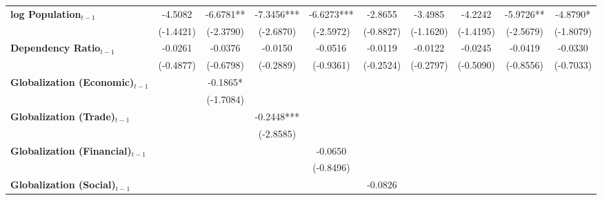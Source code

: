 \begin{center}
\begin{tabular}{lccccccccc}
\textbf{log Population$_{t-1}$}      &    -4.5082     &    -6.6781**     &    -7.3456***    &    -6.6273***    &     -2.8655      &     -3.4985      &     -4.2242      &    -5.9726**     &     -4.8790*      \\
\textbf{ }                         &   (-1.4421)    &    (-2.3790)     &    (-2.6870)     &    (-2.5972)     &    (-0.8827)     &    (-1.1620)     &    (-1.4195)     &    (-2.5679)     &    (-1.8079)      \\
\textbf{Dependency Ratio$_{t-1}$}   &    -0.0261     &     -0.0376      &     -0.0150      &     -0.0516      &     -0.0119      &     -0.0122      &     -0.0245      &     -0.0419      &     -0.0330       \\
\textbf{ }                         &   (-0.4877)    &    (-0.6798)     &    (-0.2889)     &    (-0.9361)     &    (-0.2524)     &    (-0.2797)     &    (-0.5090)     &    (-0.8556)     &    (-0.7033)      \\
\textbf{Globalization (Economic)$_{t-1}$}             &                &     -0.1865*     &                  &                  &                  &                  &                  &                  &                   \\
\textbf{ }                         &                &    (-1.7084)     &                  &                  &                  &                  &                  &                  &                   \\
\textbf{Globalization (Trade)$_{t-1}$}             &                &                  &    -0.2448***    &                  &                  &                  &                  &                  &                   \\
\textbf{ }                         &                &                  &    (-2.8585)     &                  &                  &                  &                  &                  &                   \\
\textbf{Globalization (Financial)$_{t-1}$}             &                &                  &                  &     -0.0650      &                  &                  &                  &                  &                   \\
\textbf{ }                         &                &                  &                  &    (-0.8496)     &                  &                  &                  &                  &                   \\
\textbf{Globalization (Social)$_{t-1}$}             &                &                  &                  &                  &     -0.0826      &                  &                  &                  &                   \\

\end{tabular}
\end{center}
